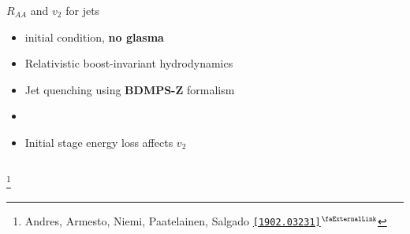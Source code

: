 \documentclass[aspectratio=169,11pt,usenames,dvipsnames]{beamer}
\renewcommand{\thefootnote}{\color{customblue}\faPaperPlaneO}
\newcommand\blfootnote[1]{%
  \begingroup
  \renewcommand\thefootnote{}\footnote{#1}%
  \addtocounter{footnote}{-1}%
  \endgroup
}
\begin{document}
\begin{frame}[t,noframenumbering]
\begin{columns}[onlytextwidth,t]
        \begin{center}
            {\Large\color{palteal} $R_{AA}$ and $v_2$ for jets \\[10pt]}
            \footnotesize
                \begin{itemize}
                    \item {\color{lightgray}{\bfseries EKRT} initial condition, {\bfseries\color{jyured} no glasma}}
                    \item {\color{lightgray}Relativistic boost-invariant hydrodynamics}
                    \item {\color{lightgray}Jet quenching using {\bfseries BDMPS-Z} formalism}
                    \item {}
                    \item {\color{lightgray}Initial stage energy loss affects $v_2$}
                \end{itemize}
        \end{center}
    \end{columns}
    \blfootnote{\scriptsize Andres, Armesto, Niemi, Paatelainen, Salgado \href{https://arxiv.org/abs/1902.03231}{\color{palgold}\texttt{[1902.03231]}$^\text{\scalebox{0.9}{\faExternalLink}}$}}
\end{frame}


\end{document}
